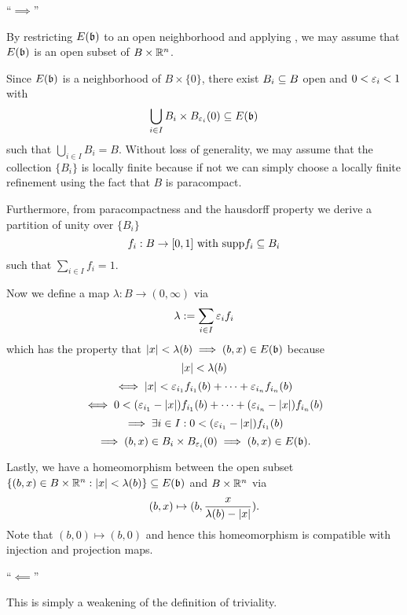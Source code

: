 \begin{myproof}
    ``$\implies$''

    By restricting $E(\mathfrak{b})$ to an open neighborhood and applying ,
    we may assume that $E(\mathfrak{b})$ is an open subset of $B \times \mathbb{R}^n$.

    Since $E(\mathfrak{b})$ is a neighborhood of $B \times \{0\}$, there exist $B_i \subseteq{} B$ open and $0 < \varepsilon{}_i < 1$ with
    \[ \bigcup_{i \in I } B_i \times \ball[\eps_i] \sub E(\bb)\]
    such that $\bigcup_{i \in I} B_i = B$.
    Without loss of generality, we may assume that the collection $\{B_i\}$ is locally finite because if not
    we can simply choose a locally finite refinement using the fact that $B$ is paracompact.

    Furthermore, from paracompactness and the hausdorff property we derive a partition of unity over $\{B_i\}$
    \[ f_i: B \to [0, 1] \text{ with } \text{supp}{f_i} \subseteq{} B_i\]
    such that $\sum_{i \in I}f_i = 1$.
    
    Now we define a map $\lambda: B \to (0, \infty)$ via
    \[ \lambda := \sum_{i \in I} \varepsilon{}_i f_i \]
    which has the property that $\vert{} x \vert{} < \lambda(b) \implies (b, x) \in E(\mathfrak{b})$ because
    \[ \vert{} x \vert{} < \lambda(b) \]
    \[ \iff  \vert{} x \vert{} < \varepsilon{}_{i_1} f_{i_1}(b) + \cdots + \varepsilon{}_{i_n} f_{i_n}(b) \]
    \[ \iff 0 < (\varepsilon{}_{i_1} - \vert{} x \vert{}) f_{i_1}(b) + \cdots + (\varepsilon{}_{i_n} - \vert{} x \vert{}) f_{i_n}(b) \]
    \[ \implies \exists i \in I: 0 < (\varepsilon{}_{i_1} - \vert{} x \vert{}) f_{i_1}(b) \]
    \[ \implies (b, x) \in B_i \times \ball[\eps_i]  \implies (b, x) \in E(\bb). \]

    Lastly, we have a homeomorphism between the open subset $\{(b, x) \in B \times \mathbb{R}^n:\vert{} x \vert{} < \lambda(b)\} \subseteq{} E(\mathfrak{b})$ and $B \times \mathbb{R}^n$ via
    \[ (b, x) \mapsto (b, \frac{x}{\lambda(b) - \vert{} x \vert{}}). \]
    Note that $(b, 0) \mapsto (b, 0)$ and hence this homeomorphism is compatible with injection and projection maps.

    ``$\impliedby$''

    This is simply a weakening of the definition of triviality. 
\end{myproof}